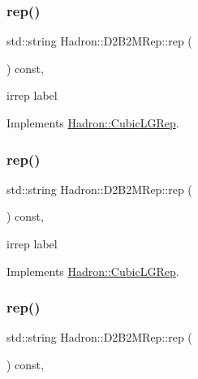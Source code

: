 \subsubsection{\texorpdfstring{rep()}{rep()}\hspace{0.1cm}{\footnotesize\ttfamily [1/3]}}
{\footnotesize\ttfamily std\+::string Hadron\+::\+D2\+B2\+M\+Rep\+::rep (\begin{DoxyParamCaption}{ }\end{DoxyParamCaption}) const\hspace{0.3cm}{\ttfamily [inline]}, {\ttfamily [virtual]}}

irrep label 

Implements \mbox{\hyperlink{structHadron_1_1CubicLGRep_a50f5ddbb8f4be4cee0106fa9e8c75e6c}{Hadron\+::\+Cubic\+L\+G\+Rep}}.

\mbox{\label{structHadron_1_1D2B2MRep_a8559e189d9cd0f50fdf541f757661332}} 
\subsubsection{\texorpdfstring{rep()}{rep()}\hspace{0.1cm}{\footnotesize\ttfamily [2/3]}}
{\footnotesize\ttfamily std\+::string Hadron\+::\+D2\+B2\+M\+Rep\+::rep (\begin{DoxyParamCaption}{ }\end{DoxyParamCaption}) const\hspace{0.3cm}{\ttfamily [inline]}, {\ttfamily [virtual]}}

irrep label 

Implements \mbox{\hyperlink{structHadron_1_1CubicLGRep_a50f5ddbb8f4be4cee0106fa9e8c75e6c}{Hadron\+::\+Cubic\+L\+G\+Rep}}.

\mbox{\label{structHadron_1_1D2B2MRep_a8559e189d9cd0f50fdf541f757661332}} 
\subsubsection{\texorpdfstring{rep()}{rep()}\hspace{0.1cm}{\footnotesize\ttfamily [3/3]}}
{\footnotesize\ttfamily std\+::string Hadron\+::\+D2\+B2\+M\+Rep\+::rep (\begin{DoxyParamCaption}{ }\end{DoxyParamCaption}) const\hspace{0.3cm}{\ttfamily [inline]}, {\ttfamily [virtual]}}

